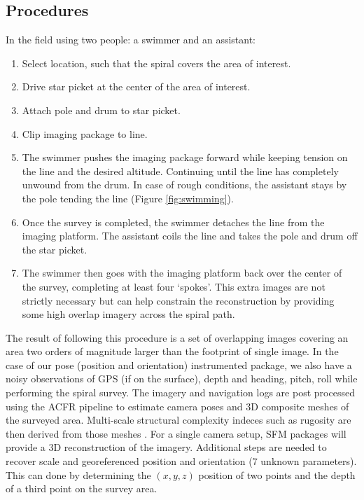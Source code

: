 \subsection{Procedures}

In the field using two people: a swimmer and an assistant:\begin{enumerate}
\item Select location, such that the spiral covers the area of interest.
\item Drive star picket at the center of the area of interest. 
\item Attach pole and drum to star picket.
\item Clip imaging package to line.
\item The swimmer pushes the imaging package forward while keeping tension on the line and the desired altitude. Continuing until the line has completely unwound from the drum. In case of rough conditions, the assistant stays by the pole tending the line (Figure \ref{fig:swimming}).
\item Once the survey is completed, the swimmer detaches the line from the imaging platform. The assistant coils the line and takes the pole and drum off the star picket. 
\item The swimmer then goes with the imaging platform back over the center of the survey, completing at least four `spokes'. This extra images are not strictly necessary but can help constrain the reconstruction by providing some high overlap imagery across the spiral path.
\end{enumerate}

The result of following this procedure is a set of overlapping images covering an area two orders of magnitude larger than the footprint of single image. In the case of our pose (position and orientation) instrumented package, we also have a noisy observations of GPS (if on the surface), depth and heading, pitch, roll while performing the spiral survey. The imagery and navigation logs are post processed using the ACFR pipeline \cite{Johnson_Roberson_2010} \cite{Mahon_2008} \cite{Johnson_Roberson_2013} to estimate camera poses and 3D composite meshes of the surveyed area. Multi-scale structural complexity indeces such as rugosity are then derived from those meshes \cite{Friedman_2012}.
For a single camera setup, SFM packages will provide a 3D reconstruction of the imagery. Additional steps are needed to recover scale and georeferenced position and orientation (7 unknown parameters). This can done by determining the $(x,y,z)$ position of two points and the depth of a third point on the survey area.
